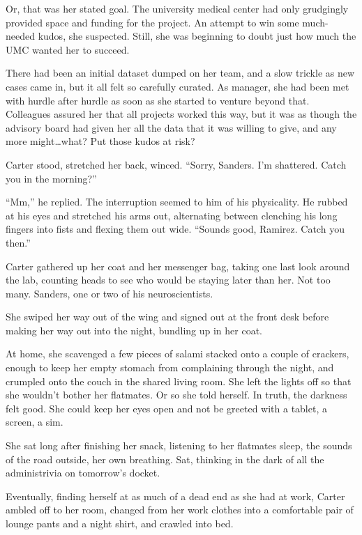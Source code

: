 Or, that was her stated goal. The university medical center had only grudgingly provided space and funding for the project. An attempt to win some much-needed kudos, she suspected. Still, she was beginning to doubt just how much the UMC wanted her to succeed.

There had been an initial dataset dumped on her team, and a slow trickle as new cases came in, but it all felt so carefully curated. As manager, she had been met with hurdle after hurdle as soon as she started to venture beyond that. Colleagues assured her that all projects worked this way, but it was as though the advisory board had given her all the data that it was willing to give, and any more might\ldots{}what? Put those kudos at risk?

Carter stood, stretched her back, winced. ``Sorry, Sanders. I'm shattered. Catch you in the morning?''

``Mm,'' he replied. The interruption seemed to him of his physicality. He rubbed at his eyes and stretched his arms out, alternating between clenching his long fingers into fists and flexing them out wide. ``Sounds good, Ramirez. Catch you then.''

Carter gathered up her coat and her messenger bag, taking one last look around the lab, counting heads to see who would be staying later than her. Not too many. Sanders, one or two of his neuroscientists.

She swiped her way out of the wing and signed out at the front desk before making her way out into the night, bundling up in her coat.

At home, she scavenged a few pieces of salami stacked onto a couple of crackers, enough to keep her empty stomach from complaining through the night, and crumpled onto the couch in the shared living room. She left the lights off so that she wouldn't bother her flatmates. Or so she told herself. In truth, the darkness felt good. She could keep her eyes open and not be greeted with a tablet, a screen, a sim.

She sat long after finishing her snack, listening to her flatmates sleep, the sounds of the road outside, her own breathing. Sat, thinking in the dark of all the administrivia on tomorrow's docket.

Eventually, finding herself at as much of a dead end as she had at work, Carter ambled off to her room, changed from her work clothes into a comfortable pair of lounge pants and a night shirt, and crawled into bed.
